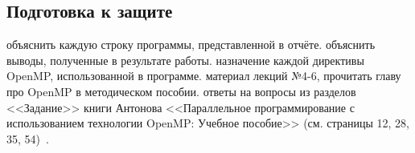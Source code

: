 \subsection{Подготовка к защите}

\begin{enumerate}
     объяснить каждую строку программы, представленной в отчёте.
     объяснить выводы, полученные в результате работы.
     назначение каждой директивы OpenMP, использованной в программе.
     материал лекций №4-6, прочитать главу про OpenMP в методическом пособии.
     ответы на вопросы из разделов <<Задание>> книги Антонова <<Параллельное программирование с использованием технологии OpenMP: Учебное пособие>> (см. страницы 12, 28, 35, 54)~\cite{AntonovOpenMP2004}.
\end{enumerate}
